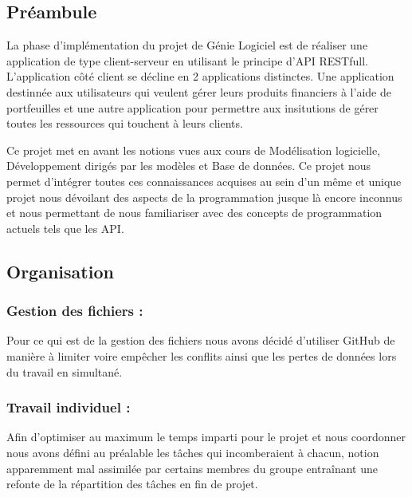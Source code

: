 \documentclass[../rapport.tex]{subfiles}
\begin{document}
\subsection{Préambule}
	La phase d'implémentation du projet de Génie Logiciel est de réaliser une application de type client-serveur en utilisant le principe d'API RESTfull.
	L'application côté client se décline en 2 applications distinctes. Une application destinnée aux utilisateurs qui veulent gérer leurs produits financiers à 
	l'aide de portfeuilles et une autre application pour permettre aux insitutions de gérer toutes les ressources qui touchent à leurs clients.

	\medskip

	Ce projet met en avant les notions vues aux cours de Modélisation logicielle, Développement dirigés par les modèles et Base de données. Ce projet nous permet
	d'intégrer toutes ces connaissances acquises au sein d'un même et unique projet nous dévoilant des aspects de la programmation jusque là encore inconnus et nous
	permettant de nous familiariser avec des concepts de programmation actuels tels que les API.

\subsection{Organisation}

	\subsubsection{Gestion des fichiers :} Pour ce qui est de la gestion des fichiers nous avons décidé d'utiliser GitHub de manière à limiter
	voire empêcher les conflits ainsi que les pertes de données lors du travail en simultané.
	

	\subsubsection{Travail individuel :} Afin d'optimiser au maximum le temps imparti pour le projet et nous coordonner nous avons défini au préalable les tâches
	qui incomberaient à chacun, notion apparemment mal assimilée par certains membres du groupe entraînant une refonte de la répartition des tâches en fin de projet.
\end{document}

